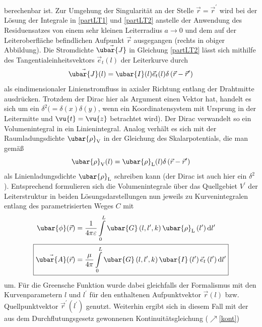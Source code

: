berechenbar ist. Zur Umgehung der Singularität an der Stelle $\vec{r}=\vec{r}^{\prime}$ wird bei der Lösung der Integrale in \ref{partLT1} und \ref{partLT2} anstelle der Anwendung des Residuensatzes von einem sehr kleinen Leiterradius $a \rightarrow 0$ und dem auf der Leiteroberfläche befindlichen Aufpunkt $\vec{r}$ ausgegangen (rechts in obiger Abbildung). Die Stromdichte $\vec{\ubar{J}}$ in Gleichung \ref{partLT2} lässt sich mithilfe des Tangentialeinheitsvektors $\vec{e}_{t}(l)$ der Leiterkurve durch
\begin{equation}
	\vec{\ubar{J}}(l)=\ubar{I}(l) \vec{e}_{t}(l) \delta\left(\vec{r}-\vec{r}^{\prime}\right) 
\end{equation}
als eindimensionaler Linienstromfluss in axialer Richtung entlang der Drahtmitte ausdrücken. Trotzdem der Dirac hier als Argument einen Vektor hat, handelt es sich um ein $\delta^2(=\delta(x)\delta(y)$, wenn ein Koordinatensystem mit Ursprung in der Leitermitte und $\vu{t}=\vu{z}$ betrachtet wird). Der Dirac verwandelt so ein Volumenintegral in ein Linienintegral. Analog verhält es sich mit der Raumladungsdichte $\ubar{\rho}_{\mathrm{V}}$ in der Gleichung des Skalarpotentials, die man gemäß
\begin{equation}
	\ubar{\rho}_{\mathrm{V}}(l)=\ubar{\rho}_{\mathrm{L}}(l) \delta\left(\vec{r}-\vec{r}^{\prime}\right) 
\end{equation}
als Linienladungsdichte $\ubar{\rho}_{\mathrm{L}}$ schreiben kann (der Dirac ist auch hier ein $\delta^2$). Entsprechend formulieren sich die Volumenintegrale über das Quellgebiet $V^{\prime}$ der Leiterstruktur in beiden Lösungsdarstellungen nun jeweils zu Kurvenintegralen entlang des parametrisierten Weges $C$ mit
\begin{align}
	 \ubar{\phi}(\vec{r})&=\frac{1}{4 \pi \varepsilon} \int\limits_{0}^{L} \ubar{G}\left(l, l^{\prime}, k\right) \ubar{\rho}_{\mathrm{L}}\left(l^{\prime}\right) \mathrm{d} l^{\prime} \label{intLT1} \\
	\Aboxed{ \vec{\ubar{A}}(\vec{r})&=\frac{\mu}{4 \pi} \int\limits_{0}^{L} \ubar{G}\left(l, l^{\prime}, k\right) \ubar{I}\left(l^{\prime}\right) \vec{e}_{t}\left(l^{\prime}\right) \mathrm{d} l^{\prime} } \label{aleiter}
\end{align}
um. Für die Greensche Funktion wurde dabei gleichfalls der Formalismus mit den Kurvenparametern $l$ und $l^{\prime}$ für den enthaltenen Aufpunktvektor $\vec{r}(l)$ bzw. Quellpunktvektor $\vec{r}^{\prime}\left(l^{\prime}\right)$ genutzt. Weiterhin ergibt sich in diesem Fall mit der aus dem Durchflutungsgesetz gewonnenen Kontinuitätsgleichung ($\nearrow$\ref{kont})
